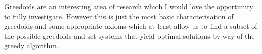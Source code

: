 \documentclass[../main.tex]{subfiles}
\begin{document}
Greedoids are an interesting area of research which I would love the opportunity to fully investigate. However this is just the most basic characterisation of greedoids and some appropriate axioms which at least allow us to find a subset of the possible greedoids and set-systems that yield optimal solutions by way of the greedy algorithm.
\end{document}
